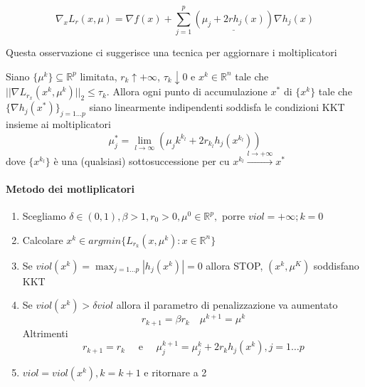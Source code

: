 \begin{observation}
 $$
 \nabla_{x} L_{r}(x, \mu) = 
 \nabla f(x) + \displaystyle \sum_{j=1}^{p}
 \underline{(\mu_j + 2rh_j(x))}
 \nabla h_j(x)
 $$
\end{observation}
Questa osservazione ci suggerisce una tecnica per
aggiornare i moltiplicatori


\begin{theo}
Siano $\{ \mu^{k} \} \subseteq \mathbb{R}^{p} $ limitata,
$r_k \uparrow + \infty$, $\tau_k \downarrow 0$ e
$x^{k} \in \mathbb{R}^{n}$ tale che $|| \nabla L_{r_{x}}(x^{k}, \mu^{k})||_{2}
\leq \tau_{k} $.
Allora ogni punto di accumulazione $x^{*}$ di $\{ x^{k} \} $ tale che
$\{ \nabla h_j(x^{*})\}_{j=1\ldots p }$ siano  linearmente indipendenti
soddisfa le condizioni KKT insieme ai moltiplicatori
$$\mu_j^{*} = \displaystyle \lim_{l \to \infty} (\mu_jk^{k_l} +
 2 r_{k_{l}} h_j(x^{k_l})) $$
dove $\{ x^{k_l}\}$ \`e una (qualsiasi) sottosuccessione per cu
$x^{k_l} \xrightarrow{l \to + \infty} x^{*}$
\end{theo}
\paragraph{Metodo dei motliplicatori}
\begin{center}
\fbox
{
	\begin{minipage}[position]{0.85\textwidth}
\begin{enumerate}
\item Scegliamo $\delta \in (0,1), \beta > 1,
r_0 > 0, \mu^{0} \in \mathbb{R}^{p},$ porre
$viol= + \infty; k =0$
\item Calcolare  $x^{k}\in argmin\{ L_{r_k}(x, \mu^{k}):
x\in \mathbb{R}^{n} \}$
\item Se $viol(x^{k}) = \displaystyle \max_{j=1\ldots p}  |h_j(x^{k})|  = 0$
  allora STOP, $(x^{k}, \mu^K) $ soddisfano KKT
\item 
  Se $viol(x^{k})> \delta viol$ allora
  il parametro di penalizzazione va aumentato
  \begin{equation}
    \label{eq:bigipenalest01}
 r_{k+1} = \beta r_k \quad \mu^{k+1} = \mu^{k}     
  \end{equation}
Altrimenti
$$r_{k+1}  = r_k \quad \text{ e } \quad
\mu_j^{k+1} = \mu_j^{k} +
2r_k h_j(x^k) , j =1 \ldots p$$
\item $viol = viol(x^{k}), k = k+1$ e ritornare a 2
\end{enumerate}
\end{minipage}
}
\end{center}

